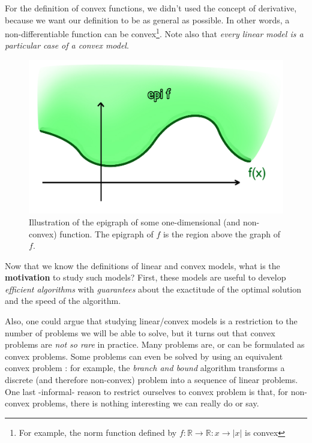 For the definition of convex functions, we didn't used the concept of derivative, because we want our definition to be as general as possible. In other words, a non-differentiable function can be convex\footnote{For example, the norm function defined by $f:\mathbb{R} \to \mathbb{R}: x \to |x|$ is convex}. Note also that \textit{every linear model is a particular case of a convex model}.\\


\begin{figure}[h!]
\centering
\includegraphics[scale=0.3]{./images/Course2_epi}
\caption{Illustration of the epigraph of some one-dimensional (and non-convex) function. The epigraph of $f$ is the region above the graph of $f$. }
\label{epi}
\end{figure}

Now that we know the definitions of linear and convex models, what is the \textbf{motivation} to study such models? First, these models are useful to develop \textit{efficient algorithms} with \textit{guarantees} about the exactitude of the optimal solution and the speed of the algorithm.

Also, one could argue that studying linear/convex models is a restriction to the number of problems we will be able to solve, but it turns out that convex problems are \textit{not so rare} in practice. Many problems are, or can be formulated as convex problems. Some problems can even be solved by using an equivalent convex problem : for example, the \textit{branch and bound} algorithm transforms a discrete (and therefore non-convex) problem into a sequence of linear problems. One last -informal- reason to restrict ourselves to convex problem is that, for non-convex problems, there is nothing interesting we can really do or say.


